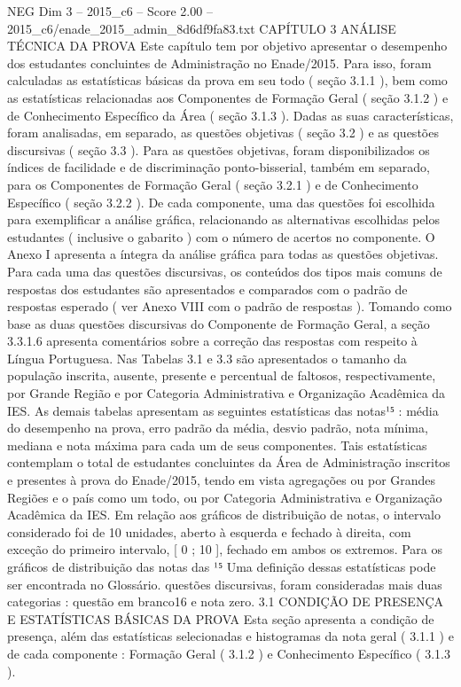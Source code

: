 \begin{textsample}{NEG Dim 3 – 2015\_c6 – Score 2.00 – 2015\_c6/enade\_2015\_admin\_8d6df9fa83.txt}  \label{ex:f3_neg_071}
CAPÍTULO 3 ANÁLISE TÉCNICA DA PROVA Este capítulo tem por objetivo apresentar o desempenho dos estudantes concluintes de Administração no Enade/2015.
Para isso, foram calculadas as estatísticas básicas da prova em seu todo ( seção 3.1.1 ), bem como as estatísticas relacionadas aos Componentes de Formação Geral ( seção 3.1.2 ) e de Conhecimento Específico da Área ( seção 3.1.3 ).
Dadas as suas características, foram analisadas, em separado, as questões objetivas ( seção 3.2 ) e as questões discursivas ( seção 3.3 ).
Para as questões objetivas, foram disponibilizados os índices de facilidade e de discriminação ponto-bisserial, também em separado, para os Componentes de Formação Geral ( seção 3.2.1 ) e de Conhecimento Específico ( seção 3.2.2 ).
De cada componente, uma das questões foi escolhida para exemplificar a análise gráfica, relacionando as alternativas escolhidas pelos estudantes ( inclusive o gabarito ) com o número de acertos no componente.
O Anexo I apresenta a íntegra da análise gráfica para todas as questões objetivas.
Para cada uma das questões discursivas, os conteúdos dos tipos mais comuns de respostas dos estudantes são apresentados e comparados com o padrão de respostas esperado ( ver Anexo VIII com o padrão de respostas ).
Tomando como base as duas questões discursivas do Componente de Formação Geral, a seção 3.3.1.6 apresenta comentários sobre a correção das respostas com respeito à Língua Portuguesa.
Nas Tabelas 3.1 e 3.3 são apresentados o tamanho da população inscrita, ausente, presente e percentual de faltosos, respectivamente, por Grande Região e por Categoria Administrativa e Organização Acadêmica da IES.
As demais tabelas apresentam as seguintes estatísticas das notas¹⁵ : média do desempenho na prova, erro padrão da média, desvio padrão, nota mínima, mediana e nota máxima para cada um de seus componentes.
Tais estatísticas contemplam o total de estudantes concluintes da Área de Administração inscritos e presentes à prova do Enade/2015, tendo em vista agregações ou por Grandes Regiões e o país como um todo, ou por Categoria Administrativa e Organização Acadêmica da IES.
Em relação aos gráficos de distribuição de notas, o intervalo considerado foi de 10 unidades, aberto à esquerda e fechado à direita, com exceção do primeiro intervalo, [ 0 ; 10 ], fechado em ambos os extremos.
Para os gráficos de distribuição das notas das ¹⁵ Uma definição dessas estatísticas pode ser encontrada no Glossário. questões discursivas, foram consideradas mais duas categorias : questão em branco16 e nota zero. 3.1 CONDIÇÃO DE PRESENÇA E ESTATÍSTICAS BÁSICAS DA PROVA Esta seção apresenta a condição de presença, além das estatísticas selecionadas e histogramas da nota geral ( 3.1.1 ) e de cada componente : Formação Geral ( 3.1.2 ) e Conhecimento Específico ( 3.1.3 ).

\end{textsample}
